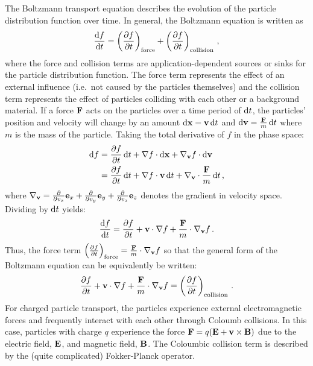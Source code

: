 \documentclass[../doc.tex]{subfiles}
\begin{document}
The Boltzmann transport equation describes the evolution of the particle distribution function over time. In general, the Boltzmann equation is written as 
	\begin{equation}
		\dderiv{f}{t} = \paren{\pderiv{f}{t}}_\text{force} + \paren{\pderiv{f}{t}}_\text{collision} \,,
	\end{equation}
where the force and collision terms are application-dependent sources or sinks for the particle distribution function. The force term represents the effect of an external influence (i.e.~not caused by the particles themselves) and the collision term represents the effect of particles colliding with each other or a background material. If a force $\F$ acts on the particles over a time period of $\ud t$, the particles' position and velocity will change by an amount $\ud \x = \v\ud t$ and $\ud \v = \frac{\F}{m} \ud t$ where $m$ is the mass of the particle. Taking the total derivative of $f$ in the phase space: 
	\begin{equation}
	\begin{aligned}
		\ud f &= \pderiv{f}{t} \ud t + \nabla f \cdot\ud \x + \nabla_{\v} f \cdot\ud \v \\
		&= \pderiv{f}{t} \ud t + \nabla f \cdot\v \ud t + \nabla_{\v}\cdot\frac{\F}{m} \ud t \,, 
	\end{aligned}
	\end{equation}
where $\nabla_{\v} = \pderiv{}{v_x} \e_x + \pderiv{}{v_y}\e_y + \pderiv{}{v_z} \e_z$ denotes the gradient in velocity space. 
Dividing by $\ud t$ yields: 
	\begin{equation}
		\dderiv{f}{t} = \pderiv{f}{t} + \v \cdot \nabla f + \frac{\F}{m} \cdot \nabla_{\v} f \,. 
	\end{equation}
Thus, the force term $\paren{\pderiv{f}{t}}_\text{force} = \frac{\F}{m}\cdot\nabla_{\v} f$ so that the general form of the Boltzmann equation can be equivalently be written: 
	\begin{equation}
		\pderiv{f}{t} + \v \cdot \nabla f + \frac{\F}{m} \cdot \nabla_{\v} f = \paren{\pderiv{f}{t}}_\text{collision} \,. 
	\end{equation}
For charged particle transport, the particles experience external electromagnetic forces and frequently interact with each other through Coloumb collisions. In this case, particles with charge $q$ experience the force $\F = q(\E + \v\times \mat{B})$ due to the electric field, $\E$, and magnetic field, $\mat{B}$. The Coloumbic collision term is described by the (quite complicated) Fokker-Planck operator. 
\end{document}
